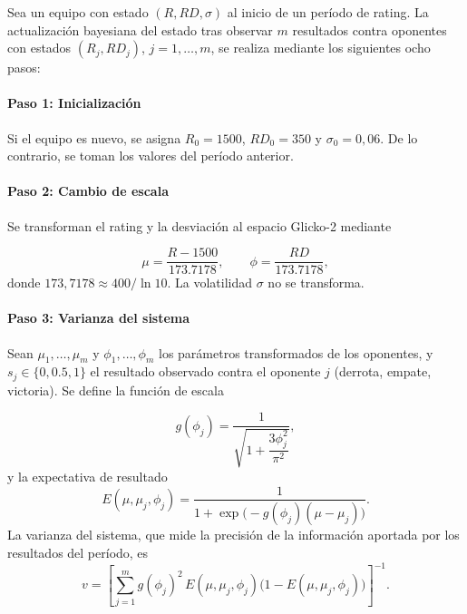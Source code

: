 \begin{definition}
	Sea un equipo con estado $(R,RD,\sigma)$ al inicio de un per\'iodo de rating. La actualizaci\'on bayesiana del estado tras observar $m$ resultados contra oponentes con estados $(R_j,RD_j)$, $j=1,\dots,m$, 
	se realiza mediante los siguientes ocho pasos:
	
	\paragraph*{Paso 1: Inicializaci\'on} Si el equipo es nuevo, se asigna $R_0=1500$, $RD_0=350$ y $\sigma_0=0{,}06$. De lo contrario, se toman los valores del per\'iodo anterior.
	
	\paragraph*{Paso 2: Cambio de escala} Se transforman el rating y la desviaci\'on al espacio Glicko-2 mediante 
	
	\begin{equation}\label{eq:glicko2_scale}
		\mu=\frac{R-1500}{173{.}7178},\qquad 
		\phi=\frac{RD}{173{.}7178},
	\end{equation}
	donde $173{,}7178\approx 400/\ln 10$. La volatilidad $\sigma$ no se transforma.
	
	\paragraph*{Paso 3: Varianza del sistema} Sean $\mu_1,\dots,\mu_m$ y $\phi_1,\dots,\phi_m$ los par\'ametros transformados de los oponentes, y $s_j\in\{0,0{.}5,1\}$ el resultado observado contra el oponente $j$ (derrota, empate, victoria). Se define la funci\'on de escala
	
	\begin{equation}\label{eq:glicko2_g}
		g(\phi_j)=\frac{1}{\sqrt{1+\dfrac{3\phi_j^{2}}{\pi^{2}}}},
	\end{equation}
	y la expectativa de resultado
	\begin{equation}\label{eq:glicko2_E}
		E(\mu,\mu_j,\phi_j)=\frac{1}{1+\exp\!\bigl(-g(\phi_j)(\mu-\mu_j)\bigr)}.
	\end{equation}
	La varianza del sistema, que mide la precisi\'on de la informaci\'on aportada por los resultados del per\'iodo, es
	\begin{equation}\label{eq:glicko2_v}
		v=\left[\sum_{j=1}^{m}g(\phi_j)^{2}\,
		E(\mu,\mu_j,\phi_j)\bigl(1-E(\mu,\mu_j,\phi_j)\bigr)\right]^{-1}.
	\end{equation}
	

\end{definition}
